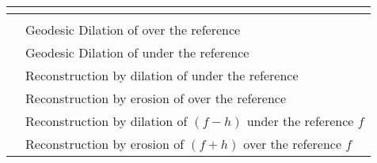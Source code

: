 
%
%
%
\begin{table}[h!]
  \centering
  \begin{tabularx}{\linewidth}{|l|Y|}
    \toprule
      \\
    \toprule
                                 &   \\
    \hline \hline
       & Geodesic Dilation of  over the reference   \\
    \hline
      & Geodesic Dilation of  under the reference    \\
    \hline
         & Reconstruction by dilation of  under the reference  \\
    \hline
     & Reconstruction by erosion of  over the reference   \\
    \hline
            & Reconstruction by dilation of ${(f-h)}$ under the reference $f$  \\
    \hline
        & Reconstruction by erosion of ${(f+h)}$ over the reference $f$  \\
    \hline
  \end{tabularx}
\end{table}

%
